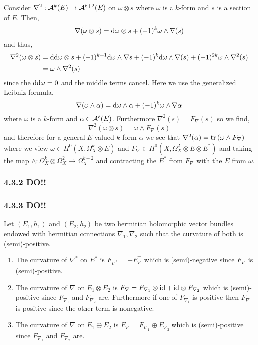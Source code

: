 \documentclass[12pt]{article}
\begin{document}
Consider $\nabla^2 : \mathcal{A}^k(E) \to \mathcal{A}^{k+2}(E)$ on $\omega \otimes s$ where $\omega$ is a $k$-form and $s$ is a section of $E$. Then,
\[ \nabla (\omega \otimes s) = \mathrm{d}{\omega} \otimes s + (-1)^k \omega \wedge \nabla(s) \]
and thus,
\begin{align*}
\nabla^2(\omega \otimes s) & = \mathrm{d}{\mathrm{d}{\omega}} \otimes s + (-1)^{k+1} \mathrm{d}{\omega} \wedge \nabla s + (-1)^k \mathrm{d}{\omega} \wedge \nabla(s) + (-1)^{2k} \omega \wedge \nabla^2(s)
\\
& = \omega \wedge \nabla^2 (s) 
\end{align*}
since the $\mathrm{d}{\mathrm{d}{\omega}} = 0$ and the middle terms cancel. Here we use the generalized Leibniz formula,
\[ \nabla (\omega \wedge \alpha) = \mathrm{d}{\omega} \wedge \alpha + (-1)^k \omega \wedge \nabla \alpha \]
where $\omega$ is a $k$-form and $\alpha \in \mathcal{A}^\ell(E)$. Furthermore $\nabla^2(s) = F_\nabla(s)$ so we find,
\[ \nabla^2 (\omega \otimes s) = \omega \wedge F_\nabla(s) \]
and therefore for a general $E$-valued $k$-form $\alpha$ we see that $\nabla^2(\alpha) = \mathrm{tr}\left( \omega \wedge F_\nabla \right)$ where we view $\omega \in H^0(X, \Omega^k_X \otimes E)$ and $F_\nabla \in H^0(X, \Omega^2_X \otimes E \otimes E^*)$ and taking the map $\wedge : \Omega^k_X \otimes \Omega^2_X \to \Omega^{k+2}_X$ and contracting the $E^*$ from $F_\nabla$ with the $E$ from $\omega$.

\subsubsection{4.3.2 DO!!}

\subsubsection{4.3.3 DO!!}

Let $(E_1, h_1)$ and $(E_2, h_2)$ be two hermitian holomorphic vector bundles endowed with hermitian connections $\nabla_1, \nabla_2$ such that the curvature of both is (semi)-positive. 

\begin{enumerate}
\item The curvature of $\nabla^*$ on $E^*$ is $F_{\nabla^*} = - F_\nabla^\top$ which is (semi)-negative since $F_{\nabla}$ is (semi)-positive.

\item The curvature of $\nabla$ on $E_1 \otimes E_2$ is $F_{\nabla} = F_{\nabla_1} \otimes \mathrm{id} + \mathrm{id} \otimes F_{\nabla_2}$ which is (semi)-positive since $F_{\nabla_1}$ and $F_{\nabla_2}$ are. Furthermore if one of $F_{\nabla_i}$ is positive then $F_{\nabla}$ is positive since the other term is nonegative.

\item The curvature of $\nabla$ on $E_1 \oplus E_2$ is $F_{\nabla} = F_{\nabla_1} \oplus F_{\nabla_2}$ which is (semi)-positive since $F_{\nabla_1}$ and $F_{\nabla_2}$ are. 
\end{enumerate}
\end{document}
